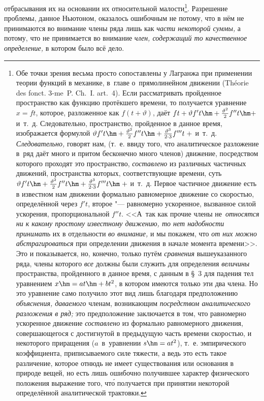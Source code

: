 отбрасывания их на основании их относительной малости\footnote{Обе точки зрения
весьма просто сопоставлены у Лагранжа при применении теории функций в механике,
в~главе о~прямолинейном движении (Théorie des fonct. 3-me~P. Ch.~I. art.~4).
Если рассматривать пройденное пространство как функцию протёкшего времени, то
получается уравнение $x=ft$, которое, разложенное как $f(t+\vartheta)$, даёт
$ft+\vartheta f't\hm+\frac{\vartheta^2}2f''t\hm+$ и~т.~д. Следовательно,
пространство, пройденное в данное время, изображается формулой
$\vartheta f't\hm+\frac{\vartheta^2}2f''t\hm+
\frac{\vartheta^3}{2\cdot 3}f'''t\;+$ и~т.~д. {\em Следовательно,} говорят нам,
(т.~е. ввиду того, что аналитическое разложение в~ряд даёт много и притом
бесконечно много членов) движение, посредством которого проходят это
пространство, {\em составлено} из различных частичных движений, пространства
которых, соответствующие времени, суть
$\vartheta f't\hm+\frac{\vartheta^2}2f''t\hm+
\frac{\vartheta^3}{2\cdot 3}f'''t\hm\;+$ и~т.~д. Первое частичное движение
есть в известном нам движении формально равномерное движение со скоростью,
определённой через
$f't$, второе "--- равномерно ускоренное, вызванное силой ускорения,
пропорциональной $f''t$. <<А~так как прочие члены не~{\em относятся ни к какому
простому известному движению, то нет надобности принимать} их в отдельности
{\em во внимание,} и мы покажем, что {\em от них можно абстрагироваться} при
определении движения в начале момента времени>>. Это и показывается, но,
конечно, только путём {\em сравнения} вышеуказанного ряда, члены которого
{\em все} должны были служить для определения {\em величины} пространства,
пройденного в данное время, с данным в \S~3 для падения тел уравнением
$x\hm=at\hm+bt^2$, в котором имеются только эти два члена. Но это уравнение
само получило этот вид лишь благодаря предположению {\em объяснения, даваемого}
членам, возникающим {\em посредством аналитического разложения в ряд;} это
предположение заключается в том, что равномерно ускоренное движение
{\em составлено} из формально равномерного движения, совершающегося
с достигнутой в предыдущую часть времени скоростью, и некоторого приращения
($a$~в~уравнении $s\hm=at^2$), т.~е. эмпирического коэффициента, приписываемого
силе тяжести, а ведь это есть такое различение, которое отнюдь не имеет
существования или основания в природе вещей, но есть лишь ошибочно получившее
характер физического положения выражение того, чт\'{о} получается при принятии
некоторой определённой аналитической трактовки.}. Разрешение проблемы, данное
Ньютоном, оказалось ошибочным не потому, что в нём не принимаются во внимание
члены ряда лишь как {\em части некоторой суммы,} а потому, что не принимается
во внимание {\em член, содержащий то качественное определение,} в котором было
всё дело.

